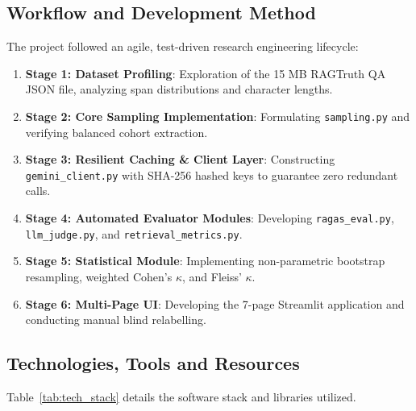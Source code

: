 \documentclass[11pt,a4paper]{article}
\begin{document}
\subsection{Workflow and Development Method}
The project followed an agile, test-driven research engineering lifecycle:
\begin{enumerate}[leftmargin=*]
    \item \textbf{Stage 1: Dataset Profiling}: Exploration of the 15 MB RAGTruth QA JSON file, analyzing span distributions and character lengths.
    \item \textbf{Stage 2: Core Sampling Implementation}: Formulating \texttt{sampling.py} and verifying balanced cohort extraction.
    \item \textbf{Stage 3: Resilient Caching \& Client Layer}: Constructing \texttt{gemini\_client.py} with SHA-256 hashed keys to guarantee zero redundant calls.
    \item \textbf{Stage 4: Automated Evaluator Modules}: Developing \texttt{ragas\_eval.py}, \texttt{llm\_judge.py}, and \texttt{retrieval\_metrics.py}.
    \item \textbf{Stage 5: Statistical Module}: Implementing non-parametric bootstrap resampling, weighted Cohen's $\kappa$, and Fleiss' $\kappa$.
    \item \textbf{Stage 6: Multi-Page UI}: Developing the 7-page Streamlit application and conducting manual blind relabelling.
\end{enumerate}

\subsection{Technologies, Tools and Resources}
Table~\ref{tab:tech_stack} details the software stack and libraries utilized.
\end{document}
